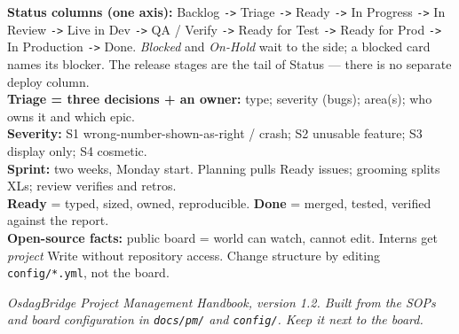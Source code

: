 \documentclass[11pt,a4paper]{report}
\newcommand{\code}[1]{\texttt{#1}}
\begin{document}
\begin{center}
\begin{tcolorbox}[enhanced,colback=white,colframe=brandblue,title=\textbf{The whole
system on one page},fonttitle=\bfseries,width=\textwidth,arc=2mm]
\textbf{Status columns (one axis):} Backlog \code{->} Triage \code{->} Ready
\code{->} In Progress \code{->} In Review \code{->} Live in Dev \code{->} QA /
Verify \code{->} Ready for Test \code{->} Ready for Prod \code{->} In Production
\code{->} Done. \emph{Blocked} and \emph{On-Hold} wait to the side; a blocked card
names its blocker. The release stages are the tail of Status --- there is no
separate deploy column.\\[4pt]
\textbf{Triage = three decisions + an owner:} type; severity (bugs); area(s); who
owns it and which epic.\\[4pt]
\textbf{Severity:} S1 wrong-number-shown-as-right / crash; S2 unusable feature;
S3 display only; S4 cosmetic.\\[4pt]
\textbf{Sprint:} two weeks, Monday start. Planning pulls Ready issues; grooming
splits XLs; review verifies and retros.\\[4pt]
\textbf{Ready} = typed, sized, owned, reproducible. \textbf{Done} = merged, tested,
verified against the report.\\[4pt]
\textbf{Open-source facts:} public board = world can watch, cannot edit. Interns get
\emph{project} Write without repository access. Change structure by editing
\code{config/*.yml}, not the board.
\end{tcolorbox}
\end{center}

\vfill
\begin{center}\small\itshape
OsdagBridge Project Management Handbook, version 1.2. Built from the SOPs and board
configuration in \code{docs/pm/} and \code{config/}. Keep it next to the board.
\end{center}
\end{document}
